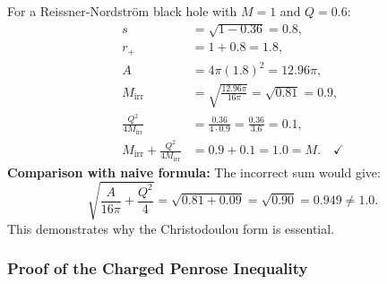 \begin{example}
For a Reissner-Nordstr\"om black hole with $M = 1$ and $Q = 0.6$:
\begin{align*}
    s &= \sqrt{1 - 0.36} = 0.8, \\
    r_+ &= 1 + 0.8 = 1.8, \\
    A &= 4\pi(1.8)^2 = 12.96\pi, \\
    M_{\mathrm{irr}} &= \sqrt{\frac{12.96\pi}{16\pi}} = \sqrt{0.81} = 0.9, \\
    \frac{Q^2}{4M_{\mathrm{irr}}} &= \frac{0.36}{4 \cdot 0.9} = \frac{0.36}{3.6} = 0.1, \\
    M_{\mathrm{irr}} + \frac{Q^2}{4M_{\mathrm{irr}}} &= 0.9 + 0.1 = 1.0 = M. \quad \checkmark
\end{align*}
\textbf{Comparison with naive formula:} The incorrect sum would give:
\[
\sqrt{\frac{A}{16\pi} + \frac{Q^2}{4}} = \sqrt{0.81 + 0.09} = \sqrt{0.90} = 0.949 \neq 1.0.
\]
This demonstrates why the Christodoulou form is essential.
\end{example}

\subsubsection{Proof of the Charged Penrose Inequality}

